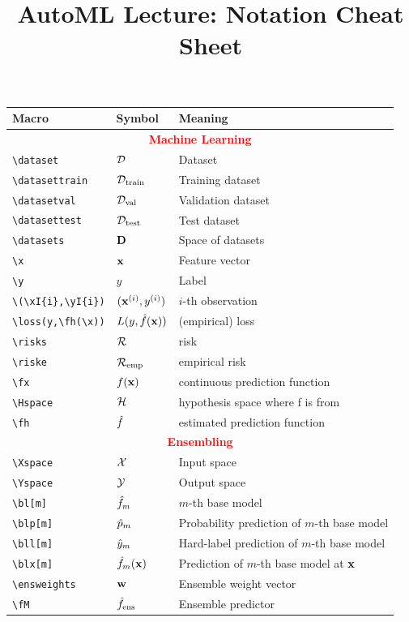 \documentclass[]{article}
\title{AutoML Lecture: Notation Cheat Sheet}
\author{}
\date{}
\begin{document}
\maketitle

\begin{table}[H]
	\begin{tabular}{lll}
		\toprule
		Macro & Symbol & Meaning \\
		\midrule
		\multicolumn{3}{c}{\textcolor{red}{\textbf{Machine Learning}}}\\
     \verb!\dataset!	& $\dataset$ & Dataset\\
     \verb!\datasettrain!	& $\datasettrain$ & Training dataset\\
	   \verb!\datasetval!	& $\datasetval$ & Validation dataset\\
     \verb!\datasettest!  & $\datasettest$ & Test dataset\\
		 \verb!\datasets!  & $\datasets$ & Space of datasets\\
     \verb!\x!  & $\x$ & Feature vector \\
     \verb!\y!  & $y$ & Label \\
     \verb!\(\xI{i},\yI{i})! &	$(\xI{i},\yI{i})$ & $i$-th observation\\
		 \verb!\loss(y,\fh(\x))!  & $\loss(y,\fh(\x))$ & (empirical) loss\\
		 \verb!\risks!  & $\risk$ & risk\\
		 \verb!\riske!  & $\riske$ & empirical risk\\
		 \verb!\fx!  & $\fx$ & continuous prediction function \\
		 \verb!\Hspace!  & $\Hspace$ & hypothesis space where f is from \\
		 \verb!\fh!  & $\fh$ & estimated prediction function \\

		\midrule
		\multicolumn{3}{c}{\textcolor{red}{\textbf{Ensembling}}}\\
		\verb!\Xspace! & $\Xspace$ & Input space \\
		\verb!\Yspace! & $\Yspace$ & Output space \\
		\verb!\bl[m]! & $\bl[m]$ & $m$-th base model \\
		\verb!\blp[m]! & $\blp[m]$ & Probability prediction of $m$-th base model \\
		\verb!\bll[m]! & $\bll[m]$ & Hard-label prediction of $m$-th base model \\
		\verb!\blx[m]! & $\blx[m]$ & Prediction of $m$-th base model at $\x$ \\
		\verb!\ensweights! & $\ensweights$ & Ensemble weight vector \\
		\verb!\fM! & $\fM$ & Ensemble predictor \\


\end{tabular}
\end{table}
\end{document}

